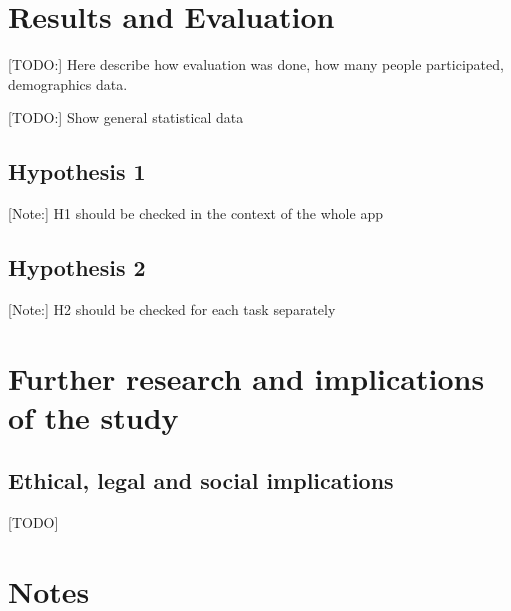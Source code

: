 \section{Results and Evaluation}

[TODO:] Here describe how evaluation was done, how many people participated, demographics data.

[TODO:] Show general statistical data

	\subsection{Hypothesis 1}
	
	[Note:] H1 should be checked in the context of the whole app
	
	\subsection{Hypothesis 2}
	
	[Note:] H2 should be checked for each task separately

\section{Further research and implications of the study}

\subsection{Ethical, legal and social implications}

[TODO]

\section{Notes}




